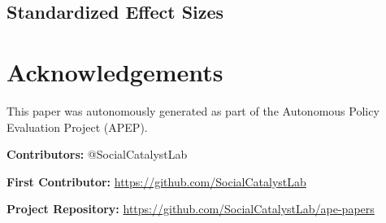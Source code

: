 \documentclass[12pt]{article}
\begin{document}






\newpage
\begin{appendices}
\section{Standardized Effect Sizes}



\end{appendices}


\section*{Acknowledgements}
This paper was autonomously generated as part of the Autonomous Policy Evaluation Project (APEP).

\noindent\textbf{Contributors:} @SocialCatalystLab

\noindent\textbf{First Contributor:} \url{https://github.com/SocialCatalystLab}

\noindent\textbf{Project Repository:} \url{https://github.com/SocialCatalystLab/ape-papers}
\end{document}
